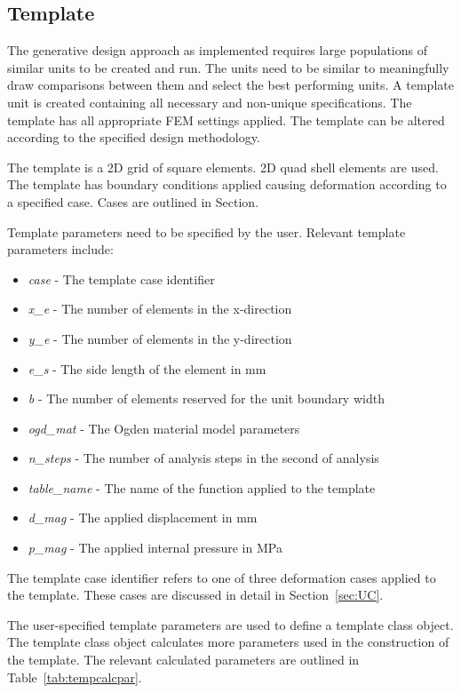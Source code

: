 \subsection{Template}

The generative design approach as implemented requires large populations of similar units to be created and run. The units need to be similar to meaningfully draw comparisons between them and select the best performing units. A template unit is created containing all necessary and non-unique specifications. The template has all appropriate FEM settings applied. The template can be altered according to the specified design methodology.

The template is a 2D grid of square elements. 2D quad shell elements are used. The template has boundary conditions applied causing deformation according to a specified case. Cases are outlined in Section.

Template parameters need to be specified by the user. Relevant template parameters include:

\begin{itemize}
	\item \textit{case} - The template case identifier
	\item \textit{x\_e} - The number of elements in the x-direction 
	\item \textit{y\_e} - The number of elements in the y-direction
	\item \textit{e\_s} - The side length of the element in mm
	\item \textit{b} - The number of elements reserved for the unit boundary width
	\item \textit{ogd\_mat} - The Ogden material model parameters
	\item \textit{n\_steps} - The number of analysis steps in the second of analysis
	\item \textit{table\_name} - The name of the function applied to the template
	\item \textit{d\_mag} - The applied displacement in mm
	\item \textit{p\_mag} - The applied internal pressure in MPa
\end{itemize}

The template case identifier refers to one of three deformation cases applied to the template. These cases are discussed in detail in Section~\ref{sec:UC}.

The user-specified template parameters are used to define a template class object. The template class object calculates more parameters used in the construction of the template. The relevant calculated parameters are outlined in Table~\ref{tab:tempcalcpar}.

